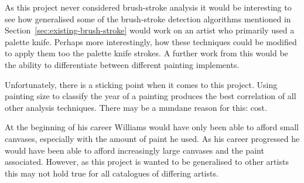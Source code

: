 As this project never considered brush-stroke analysis it would be interesting to see how 
generalised some of the brush-stroke detection algorithms mentioned in 
Section~\ref{sec:existing-brush-stroke} would work on an artist who primarily used a palette knife. Perhaps more interestingly, how these techniques could be modified to apply them too the palette 
knife strokes. A further work from this would be the ability to differentiate between different
painting implements.


Unfortunately, there is a sticking point when it comes to this project. Using painting size to 
classify the year of a painting produces the best correlation of all other analysis techniques.
There may be a mundane reason for this: cost.

At the beginning of his career Williams would have only been able to afford small canvases, 
especially with the amount of paint he used. As his career progressed he would have been able
to afford increasingly large canvases and the paint associated. However, as this project is wanted
to be generalised to other artists this may not hold true for all catalogues of differing artists.
